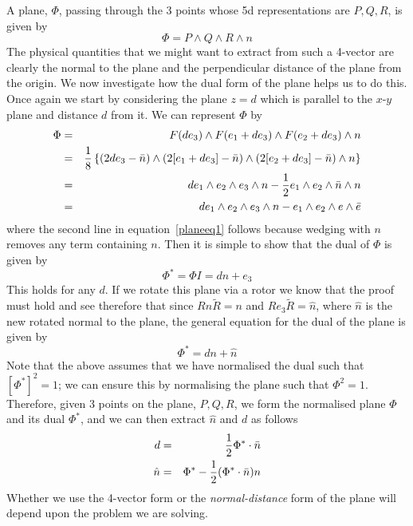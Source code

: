A plane, $\Phi$, passing through the 3 points whose 5d
representations are $P,Q,R$, is given by
%
\[ \Phi = P\wedge Q \wedge R \wedge n  \]
%
The physical quantities that we might want to extract
from such a 4-vector are clearly the normal to the plane
and the perpendicular distance of the plane from the
origin. We now investigate how the dual form of the plane
helps us to do this. Once again we start by considering
the plane $z=d$ which is parallel to the $x$-$y$ plane
and distance $d$ from it. We can represent $\Phi$ by
%
\begin{eqnarray}
\Phi &  =  &  F(de_3)\wedge F(e_1 + de_3) \wedge
F(e_2+de_3)\wedge n \nonumber \\
     &  =  & \frac{1}{8} \left\{ (2de_3-\bar{n})\wedge
     (2[e_1+de_3]-\bar{n})\wedge (2[e_2+de_3]-\bar{n})\wedge
     n\right\}  \nonumber \\
     &  =  &  de_1\wedge e_2 \wedge e_3\wedge n - \frac{1}{2} e_1\wedge
     e_2\wedge \bar{n}\wedge n \nonumber \\
     &  =  & de_1\wedge e_2 \wedge e_3\wedge n - e_1\wedge
     e_2\wedge e\wedge \bar{e}
     \label{planeeq1}
\end{eqnarray}
%
where the second line in equation~\ref{planeeq1} follows
because wedging with $n$ removes any term containing $n$.
Then it is simple to show that the dual of $\Phi$ is
given by
%
\begin{equation}
\Phi^* = \Phi I=  dn + e_3
\end{equation}
%
This holds for any $d$. If we rotate this plane via a
rotor we know that the proof must hold and see therefore
that since $Rn\tilde{R}=n$ and $Re_3\tilde{R}=\hat{n}$,
where $\hat{n}$ is the new rotated normal to the plane,
the general equation for the dual of the plane is given
by
%
\begin{equation}
\Phi^* = dn + \hat{n}
\end{equation}
%
Note that the above assumes that we have normalised the
dual such that $[\Phi^*]^2=1$; we can ensure this by
normalising the plane such that $\Phi^2 = 1$. Therefore,
given 3 points on the plane, $P,Q,R$, we form the
normalised plane $\Phi$ and its dual $\Phi^*$, and we can
then extract $\hat{n}$ and $d$ as follows
%
\begin{eqnarray}
 d  & = &  \frac{1}{2} \Phi^*\cdot \bar{n} \\
   \hat{n} &  = &  \Phi^* - \frac{1}{2} (\Phi^*\cdot\bar{n})n
\end{eqnarray}
%
Whether we use the 4-vector form or the  \emph{normal-distance} 
form of the plane will depend upon the
problem we are solving.


